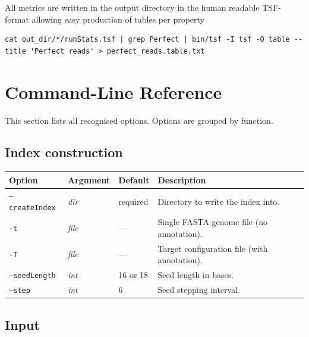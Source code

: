 \documentclass[11pt]{article}
\newcommand{\code}[1]{\texttt{#1}}
\begin{document}
All metrics are written in the output directory
in the human readable TSF-format
allowing easy production of tables per property

\begin{lstlisting}
cat out_dir/*/runStats.tsf | grep Perfect | bin/tsf -I tsf -O table --title 'Perfect reads' > perfect_reads.table.txt
\end{lstlisting}


\section{Command-Line Reference}
\label{sec:cmdref}

This section lists all recognised options.  Options are grouped by
function.

\subsection{Index construction}

\begin{center}
\begin{longtable}{p{4cm} p{2.2cm} p{2cm} p{6cm}}
\toprule
\textbf{Option} & \textbf{Argument} & \textbf{Default} & \textbf{Description} \\
\midrule
\endhead
\code{--createIndex} & \textit{dir}  & required & Directory to write the index into. \\
\code{-t}            & \textit{file} & ---       & Single FASTA genome file (no annotation). \\
\code{-T}            & \textit{file} & ---       & Target configuration file (with annotation). \\
\code{--seedLength}  & \textit{int}  & 16 or 18  & Seed length in bases. \\
\code{--step}        & \textit{int}  & 6         & Seed stepping interval. \\
\bottomrule
\end{longtable}
\end{center}

\subsection{Input}
\end{document}
